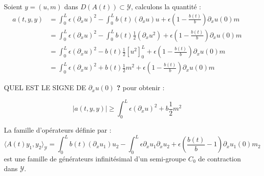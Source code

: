 \documentclass[a4paper]{article}
\newcommand{\dep}{b}
\begin{document}
\begin{preuve}
	Soient $y=(u,m)$ dans $D(A(t)) \subset {\mathscr{Y}}$, calculons la quantité :
	\[
	\begin{split}
		 a(t,y,y) &=  \int_0^L \epsilon (\partial_x u)^2
		                 - \int_0^L \dep (t) (\partial_x u)u
						 + \epsilon (1 - \displaystyle \frac{\dep (t)}{\dep}) \partial_xu(0)m\\
				  &= \int_0^L \epsilon (\partial_xu)^2
				     - \int_0^L \dep (t) \displaystyle \frac{1}{2} (\partial_xu^2)
					 + \epsilon (1 -  \frac{\dep (t)}{\dep}) \partial_xu(0)m \\
				 & = \int_0^L \epsilon (\partial_xu)^2
				 -  \dep (t)\displaystyle \frac{1}{2} [u^2]_0^L
				  + \epsilon (1 -  \frac{\dep (t)}{\dep}) \partial_xu(0)m \\
 				 & = \int_0^L \epsilon (\partial_xu)^2
 				   + \dep (t)\displaystyle \frac{1}{2} m^2
 				    + \epsilon (1-\displaystyle \frac{\dep (t)}{\dep}) \partial_xu(0)m		  
    \end{split}
	\]
	
	
	
	
	QUEL EST LE  SIGNE DE $\partial_xu(0)$ \textbf{?} pour obtenir :
	
	\[  |a(t,y,y)| \geq \int_0^L \epsilon (\partial_xu)^2
 				   + \dep \displaystyle \frac{1}{2} m^2 \]
	
\end{preuve}
 
 
 
 \begin{proposition}
 	\label{prop:cas3}
 	La famille d'opérateurs définie par :
 	\begin{equation} 
 		\label{def:A3}
 	\langle A(t) y_1,y_2\rangle_{\mathscr{Y}} 
                                     = \int_0^L \dep (t) (\partial_xu_1)u_2
 						 - \int_0^L \epsilon \partial_xu_1 \partial_xu_2
 					+ \epsilon (\displaystyle \frac{\dep (t)}{\dep}-1) \partial_xu_1(0)m_2
 	\end{equation}
 	est une famille de générateurs infinitésimal
	 d'un semi-groupe $C_0$ de contraction dans $\mathscr{Y}$.
 \end{proposition}						
 

\newpage
\end{document}
